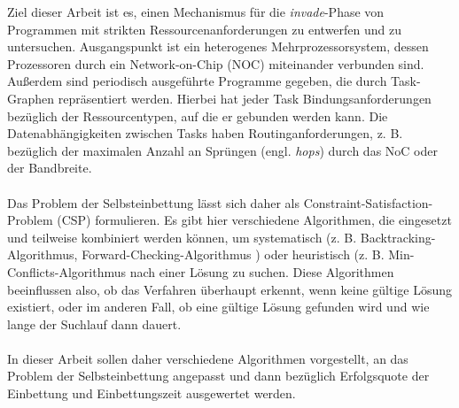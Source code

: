 Ziel dieser Arbeit ist es, einen Mechanismus für die \textit{invade}-Phase von Programmen mit strikten Ressourcenanforderungen zu entwerfen
und zu untersuchen. Ausgangspunkt ist ein heterogenes Mehrprozessorsystem,
dessen Prozessoren durch ein Network-on-Chip (NOC) \cite{mappingNocArchitectures} miteinander verbunden
sind. Außerdem sind periodisch ausgeführte Programme gegeben, die durch
Task-Graphen repräsentiert werden. Hierbei hat jeder Task Bindungsanforderungen bezüglich der Ressourcentypen, auf die er gebunden werden kann. Die
Datenabhängigkeiten zwischen Tasks haben Routinganforderungen, z. B. bezüglich
der maximalen Anzahl an Sprüngen (engl. \textit{hops}) durch das NoC oder der
Bandbreite. \\ \\
Das Problem der Selbsteinbettung lässt sich daher als Constraint-Satisfaction-Problem (CSP) \cite{foundationCSP} \cite{tutorialCSP} formulieren. Es gibt hier verschiedene Algorithmen, die
eingesetzt und teilweise kombiniert werden können, um systematisch (z. B. Backtracking-
Algorithmus, Forward-Checking-Algorithmus \cite{foundationCSP}) oder heuristisch (z. B.
Min-Conflicts-Algorithmus \cite{cspsolvingRepairMethod} nach einer Lösung zu suchen. Diese Algorithmen
beeinflussen also, ob das Verfahren überhaupt erkennt, wenn keine gültige
Lösung existiert, oder im anderen Fall, ob eine gültige Lösung gefunden wird
und wie lange der Suchlauf dann dauert. \\ \\
In dieser Arbeit sollen daher verschiedene Algorithmen vorgestellt, an das Problem
der Selbsteinbettung angepasst und dann bezüglich Erfolgsquote der Einbettung
und Einbettungszeit ausgewertet werden.